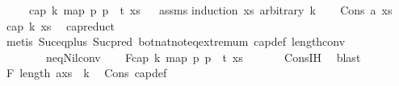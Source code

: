 \begin{isabellebody}
\ \ \ \ \ {\isachardoublequoteopen}cap\ k\ {\isacharparenleft}{\kern0pt}map\ {\isacharparenleft}{\kern0pt}{\isasymlambda}p{\isachardot}{\kern0pt}\ p\ {\isacharplus}{\kern0pt}\ t{\isacharparenright}{\kern0pt}\ xs{\isacharparenright}{\kern0pt}{\isachardoublequoteclose}%
\isadelimproof
\ %
\endisadelimproof
%
\isatagproof
{}\isamarkupfalse%
\ assms\isanewline
{}\isamarkupfalse%
{\isacharparenleft}{\kern0pt}induction\ xs\ arbitrary{\isacharcolon}{\kern0pt}\ k{\isacharparenright}{\kern0pt}\isanewline
\ \ \isamarkupfalse%
\ {\isacharparenleft}{\kern0pt}Cons\ a\ xs{\isacharparenright}{\kern0pt}\isanewline
\ \ \isamarkupfalse%
\ {\isachardoublequoteopen}cap\ {\isacharparenleft}{\kern0pt}k{\isacharminus}{\kern0pt}{}{\isacharparenright}{\kern0pt}\ xs{\isachardoublequoteclose}\ \isamarkupfalse%
\ cap{\isacharunderscore}{\kern0pt}reduct\isanewline
\ \ \ \ \isamarkupfalse%
\ {\isacharparenleft}{\kern0pt}metis\ Suc{\isacharunderscore}{\kern0pt}eq{\isacharunderscore}{\kern0pt}plus{}\ Suc{\isacharunderscore}{\kern0pt}pred{\isacharprime}{\kern0pt}\ bot{\isacharunderscore}{\kern0pt}nat{\isacharunderscore}{\kern0pt}{}{\isachardot}{\kern0pt}not{\isacharunderscore}{\kern0pt}eq{\isacharunderscore}{\kern0pt}extremum\ cap{\isacharunderscore}{\kern0pt}def\ length{\isacharunderscore}{\kern0pt}{}{\isacharunderscore}{\kern0pt}conv\isanewline
\ \ \ \ \ \ \ \ neq{\isacharunderscore}{\kern0pt}Nil{\isacharunderscore}{\kern0pt}conv{\isacharparenright}{\kern0pt}\isanewline
\ \ \isamarkupfalse%
\ F{}{\isacharcolon}{\kern0pt}{\isachardoublequoteopen}cap\ {\isacharparenleft}{\kern0pt}k{\isacharminus}{\kern0pt}{}{\isacharparenright}{\kern0pt}\ {\isacharparenleft}{\kern0pt}map\ {\isacharparenleft}{\kern0pt}{\isasymlambda}p{\isachardot}{\kern0pt}\ p\ {\isacharplus}{\kern0pt}\ t{\isacharparenright}{\kern0pt}\ xs{\isacharparenright}{\kern0pt}{\isachardoublequoteclose}\ \isanewline
\ \ \ \ \isamarkupfalse%
\ Cons{\isachardot}{\kern0pt}IH\ \isamarkupfalse%
\ blast\isanewline
\ \ \isamarkupfalse%
\ F{}{\isacharcolon}{\kern0pt}\ {\isachardoublequoteopen}length\ {\isacharparenleft}{\kern0pt}a{\isacharhash}{\kern0pt}xs{\isacharparenright}{\kern0pt}\ {\isacharequal}{\kern0pt}\ k{\isachardoublequoteclose}\ \isamarkupfalse%
\ Cons{\isacharparenleft}{\kern0pt}{}{\isacharparenright}{\kern0pt}\ cap{\isacharunderscore}{\kern0pt}def\ \isamarkupfalse%

\end{isabellebody}
